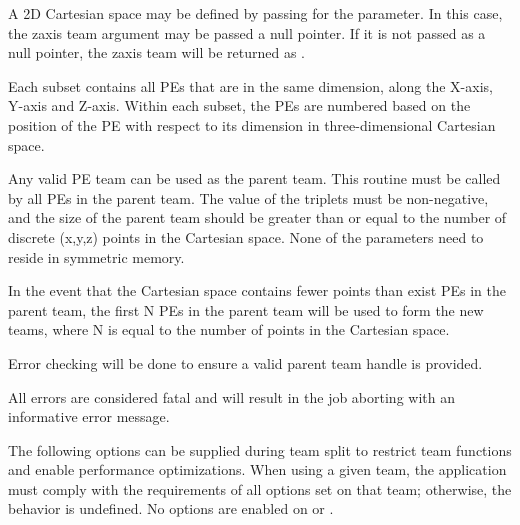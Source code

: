 \begin{apidefinition}
{A 2D Cartesian space may be defined by passing  for the 
parameter. In this case, the zaxis team argument may be passed a null
pointer. If it is not passed as a null pointer, the zaxis team will be returned
as .

Each subset contains all \acp{PE} that are in the same
dimension, along the X-axis, Y-axis and Z-axis. Within each subset,
the \acp{PE} are numbered based on the position of the \ac{PE} with respect to its
dimension in three-dimensional Cartesian space.

Any valid \ac{PE} team can be used as the parent team. This routine must be
called by all \acp{PE} in the parent team. The value of the triplets must be
non-negative, and the size of the parent team should be greater than or
equal to the number of discrete (x,y,z) points in the Cartesian space.
None of the parameters need to reside in symmetric memory.

In the event that the Cartesian space contains fewer points than exist \acp{PE}
in the parent team, the first N \acp{PE} in the parent team will be used
to form the new teams, where N is equal to the number of points in the
Cartesian space.

Error checking will be done to ensure a valid parent team handle is provided.

\begin{FeedbackRequest}
All errors are considered fatal and will result in the job aborting with
an informative error message.
\end{FeedbackRequest}

The following options can be supplied during team split to restrict
team functions and enable performance optimizations.  When using a given
team, the application must comply with the requirements of all options
set on that team; otherwise, the behavior is undefined.
No options are enabled on  or .

}



\begin{apiexamples}

\end{apiexamples}

\end{apidefinition}
